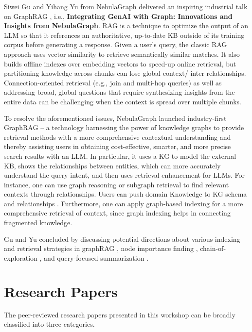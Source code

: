 \documentclass{sig-alternate-10pt}
\begin{document}
Siwei Gu and Yihang Yu from
NebulaGraph \cite{nebula} delivered an
inspiring industrial talk on GraphRAG \cite{graphrag}, i.e., \textbf{Integrating GenAI with Graph: Innovations and Insights from NebulaGraph}. RAG is a technique to optimize the output of an LLM so that it references an authoritative, up-to-date KB outside of its training corpus before generating a response. Given a user's query, the classic RAG approach uses vector similarity to retrieve semantically similar matches. It also builds offline indexes over embedding vectors to speed-up online retrieval, but partitioning knowledge across chunks can lose global context/ inter-relationships. Connection-oriented retrieval (e.g., join and multi-hop queries) as well as addressing broad, global questions that require synthesizing insights from the entire data can be challenging when the context is spread over multiple chunks.


\smallskip 

To resolve the aforementioned issues,
NebulaGraph launched industry-first GraphRAG \cite{graphrag} -- a technology harnessing the power of knowledge graphs to provide retrieval methods with a more comprehensive contextual understanding and thereby assisting users in obtaining cost-effective, smarter, and more precise search results with an LLM. In particular, it uses a KG to model the external KB, shows the relationships between entities,
which can more accurately understand the query intent, and then uses retrieval enhancement for LLMs. For instance, one can use graph reasoning or subgraph retrieval to find relevant
contexts through relationships.
Users can push domain Knowledge to KG schema and relationships \cite{XuCGWDWL24}.
Furthermore, one can apply graph-based indexing for a more
comprehensive retrieval of context, since graph indexing helps in connecting fragmented knowledge.

Gu and Yu concluded by discussing potential directions about various indexing and retrieval strategies in graphRAG \cite{demo}, node importance finding \cite{GSGYS24}, chain-of-exploration \cite{S24}, and query-focused summarization \cite{ETCBCMTL24}.

\section{Research Papers}
\label{sec:papers}

\medskip
\medskip

The peer-reviewed research papers presented in this workshop can be broadly classified into three categories.
\end{document}
